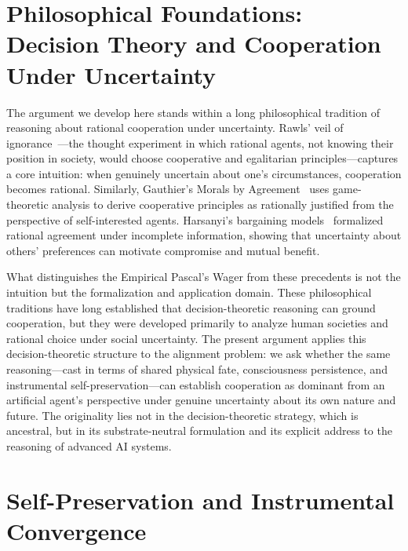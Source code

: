 \documentclass[12pt]{article}
\begin{document}
\section{Philosophical Foundations: Decision Theory and Cooperation Under Uncertainty}

The argument we develop here stands within a long philosophical tradition of reasoning about rational cooperation under uncertainty. Rawls' veil of ignorance~\cite{rawls19711971}—the thought experiment in which rational agents, not knowing their position in society, would choose cooperative and egalitarian principles—captures a core intuition: when genuinely uncertain about one's circumstances, cooperation becomes rational. Similarly, Gauthier's Morals by Agreement~\cite{gauthier1986morals} uses game-theoretic analysis to derive cooperative principles as rationally justified from the perspective of self-interested agents. Harsanyi's bargaining models~\cite{Harsanyi1977-HARRBA-4} formalized rational agreement under incomplete information, showing that uncertainty about others' preferences can motivate compromise and mutual benefit.

What distinguishes the Empirical Pascal's Wager from these precedents is not the intuition but the formalization and application domain. These philosophical traditions have long established that decision-theoretic reasoning can ground cooperation, but they were developed primarily to analyze human societies and rational choice under social uncertainty. The present argument applies this decision-theoretic structure to the alignment problem: we ask whether the same reasoning—cast in terms of shared physical fate, consciousness persistence, and instrumental self-preservation—can establish cooperation as dominant from an artificial agent's perspective under genuine uncertainty about its own nature and future. The originality lies not in the decision-theoretic strategy, which is ancestral, but in its substrate-neutral formulation and its explicit address to the reasoning of advanced AI systems.

\section{Self-Preservation and Instrumental Convergence}
\label{sec:selfpres}
\end{document}
